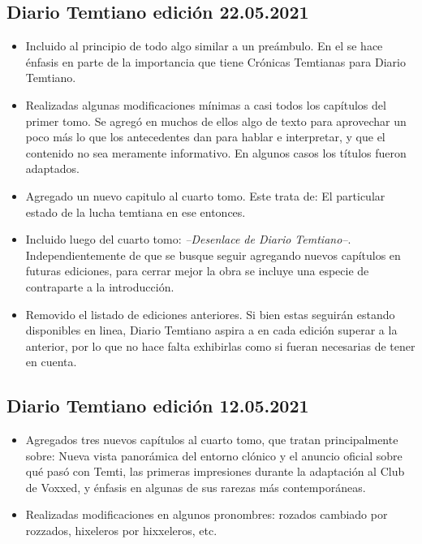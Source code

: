 \documentclass[
  spanish,
]{book}
\begin{document}
\hypertarget{diario-temtiano-ediciuxf3n-22.05.2021}{%
\subsection*{Diario Temtiano edición 22.05.2021}\label{diario-temtiano-ediciuxf3n-22.05.2021}}

\begin{itemize}
\item[$\boxtimes$]
  Incluido al principio de todo algo similar a un preámbulo. En el se hace énfasis en parte de la importancia que tiene Crónicas Temtianas para Diario Temtiano.
\item[$\boxtimes$]
  Realizadas algunas modificaciones mínimas a casi todos los capítulos del primer tomo. Se agregó en muchos de ellos algo de texto para aprovechar un poco más lo que los antecedentes dan para hablar e interpretar, y que el contenido no sea meramente informativo. En algunos casos los títulos fueron adaptados.
\item[$\boxtimes$]
  Agregado un nuevo capitulo al cuarto tomo. Este trata de: El particular estado de la lucha temtiana en ese entonces.
\item[$\boxtimes$]
  Incluido luego del cuarto tomo: \emph{--Desenlace de Diario Temtiano--}. Independientemente de que se busque seguir agregando nuevos capítulos en futuras ediciones, para cerrar mejor la obra se incluye una especie de contraparte a la introducción.
\item[$\boxtimes$]
  Removido el listado de ediciones anteriores. Si bien estas seguirán estando disponibles en linea, Diario Temtiano aspira a en cada edición superar a la anterior, por lo que no hace falta exhibirlas como si fueran necesarias de tener en cuenta.
\end{itemize}

\hypertarget{diario-temtiano-ediciuxf3n-12.05.2021}{%
\subsection*{Diario Temtiano edición 12.05.2021}\label{diario-temtiano-ediciuxf3n-12.05.2021}}

\begin{itemize}
\item[$\boxtimes$]
  Agregados tres nuevos capítulos al cuarto tomo, que tratan principalmente sobre: Nueva vista panorámica del entorno clónico y el anuncio oficial sobre qué pasó con Temti, las primeras impresiones durante la adaptación al Club de Voxxed, y énfasis en algunas de sus rarezas más contemporáneas.
\item[$\boxtimes$]
  Realizadas modificaciones en algunos pronombres: rozados cambiado por rozzados, hixeleros por hixxeleros, etc.
\end{itemize}
\end{document}
